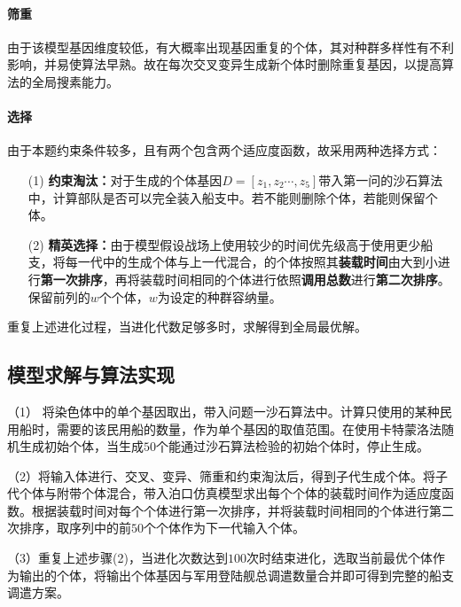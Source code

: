 \documentclass{whutmod}
\begin{document}
     \paragraph{筛重}
     由于该模型基因维度较低，有大概率出现基因重复的个体，其对种群多样性有不利影响，并易使算法早熟。故在每次交叉变异生成新个体时删除重复基因，以提高算法的全局搜素能力。
     \paragraph{选择}
     由于本题约束条件较多，且有两个包含两个适应度函数，故采用两种选择方式：
     \begin{itemize}
     \item [(1)] \textbf{约束淘汰：}对于生成的个体基因$D=[z_{1},z_{2}\cdots,z_{5}]$带入第一问的沙石算法中，计算部队是否可以完全装入船支中。若不能则删除个体，若能则保留个体。
     \item [(2)]\textbf{精英选择：}由于模型假设战场上使用较少的时间优先级高于使用更少船支，将每一代中的生成个体与上一代混合，的个体按照其\textbf{装载时间}由大到小进行\textbf{第一次排序}，再将装载时间相同的个体进行依照\textbf{调用总数}进行\textbf{第二次排序}。保留前列的$w$个个体，$w$为设定的种群容纳量。
     \end{itemize}
     重复上述进化过程，当进化代数足够多时，求解得到全局最优解。

     \subsection{模型求解与算法实现}


   	 （1） 将染色体中的单个基因取出，带入问题一沙石算法中。计算只使用的某种民用船时，需要的该民用船的数量，作为单个基因的取值范围。在使用卡特蒙洛法随机生成初始个体，当生成$50$个能通过沙石算法检验的初始个体时，停止生成。
   	 
   	 （2）将输入体进行、交叉、变异、筛重和约束淘汰后，得到子代生成个体。将子代个体与附带个体混合，带入泊口仿真模型求出每个个体的装载时间作为适应度函数。根据装载时间对每个个体进行第一次排序，并将装载时间相同的个体进行第二次排序，取序列中的前$50$个个体作为下一代输入个体。

   （3）重复上述步骤(2)，当进化次数达到$100$次时结束进化，选取当前最优个体作为输出的个体，将输出个体基因与军用登陆舰总调遣数量合并即可得到完整的船支调遣方案。
\end{document}
